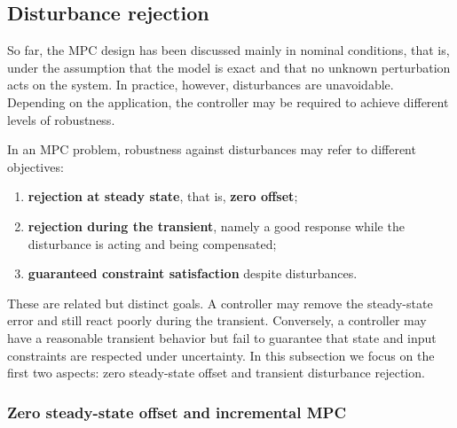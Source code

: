 \subsection{Disturbance rejection}

So far, the MPC design has been discussed mainly in nominal conditions, that is, under the assumption that the model is exact and that no unknown perturbation acts on the system. In practice, however, disturbances are unavoidable. Depending on the application, the controller may be required to achieve different levels of robustness.

\begin{theorembox}
In an MPC problem, robustness against disturbances may refer to different objectives:
\begin{enumerate}
    \item \textbf{rejection at steady state}, that is, \textbf{zero offset};
    \item \textbf{rejection during the transient}, namely a good response while the disturbance is acting and being compensated;
    \item \textbf{guaranteed constraint satisfaction} despite disturbances.
\end{enumerate}
\end{theorembox}

These are related but distinct goals. A controller may remove the steady-state error and still react poorly during the transient. Conversely, a controller may have a reasonable transient behavior but fail to guarantee that state and input constraints are respected under uncertainty. In this subsection we focus on the first two aspects: zero steady-state offset and transient disturbance rejection.

\subsubsection{Zero steady-state offset and incremental MPC}

